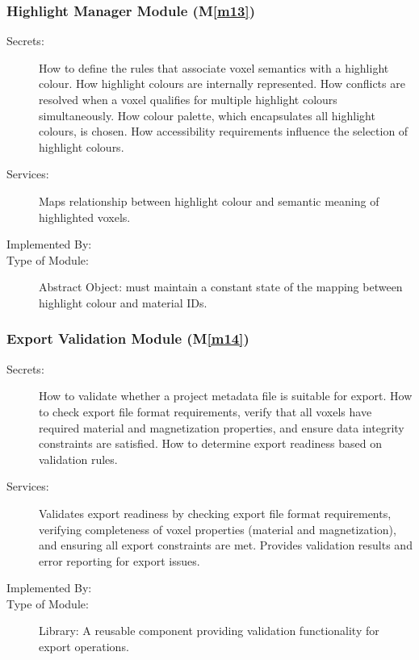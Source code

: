 \documentclass[12pt, titlepage]{article}
\newcommand{\mref}[1]{M\ref{#1}}
\begin{document}
\subsubsection{Highlight Manager Module (\mref{m13})}

\begin{description}
  \item[Secrets:] How to define the rules that associate voxel semantics with a highlight colour. How highlight colours are internally represented. How conflicts are resolved when a voxel qualifies for multiple highlight colours simultaneously. How colour palette, which encapsulates all highlight colours, is chosen. How accessibility requirements influence the selection of highlight colours.
  \item[Services:] Maps relationship between highlight colour and semantic meaning of highlighted voxels.
  \item[Implemented By:] \progname{}
  \item[Type of Module:] Abstract Object: must maintain a constant state of the mapping between highlight colour and material IDs.
\end{description}

\subsubsection{Export Validation Module (\mref{m14})}

\begin{description}
\item[Secrets:] How to validate whether a project metadata file is suitable for export. How to check export file format requirements, verify that all voxels have required material and magnetization properties, and ensure data integrity constraints are satisfied. How to determine export readiness based on validation rules.
\item[Services:] Validates export readiness by checking export file format requirements, verifying completeness of voxel properties (material and magnetization), and ensuring all export constraints are met. Provides validation results and error reporting for export issues.
\item[Implemented By:] \progname{}
\item[Type of Module:] Library: A reusable component providing validation functionality for export operations.
\end{description} 

\iffalse
\end{document}
